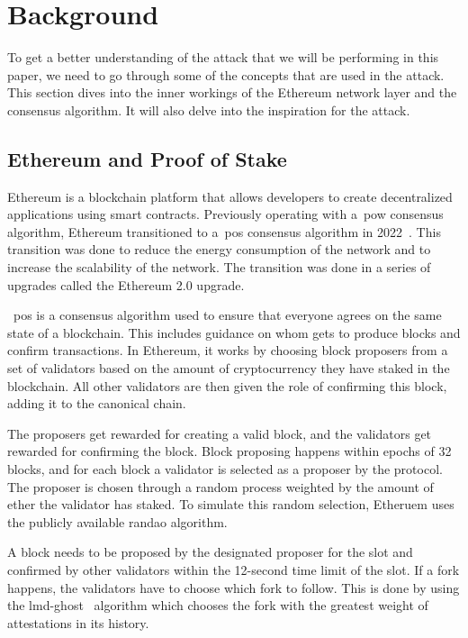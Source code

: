 
\section{Background}\label{sec:background}
To get a better understanding of the attack that we will be performing in this paper, we need to go through some of the concepts that are used in the attack.
This section dives into the inner workings of the Ethereum network layer and the consensus algorithm.
It will also delve into the inspiration for the attack.


\subsection{Ethereum and Proof of Stake}\label{subsec:ethereum-and-proof-of-stake}
Ethereum is a blockchain platform that allows developers to create decentralized applications using smart contracts.
Previously operating with a~\gls{pow} consensus algorithm, Ethereum transitioned to a~\gls{pos} consensus algorithm in 2022~\cite{EthereumProof-of-stakePoS}.
This transition was done to reduce the energy consumption of the network and to increase the scalability of the network.
The transition was done in a series of upgrades called the Ethereum 2.0 upgrade.

~\gls{pos} is a consensus algorithm used to ensure that everyone agrees on the same state of a blockchain.
This includes guidance on whom gets to produce blocks and confirm transactions.
In Ethereum, it works by choosing block proposers from a set of validators based on the amount of cryptocurrency they have staked in the blockchain.
All other validators are then given the role of confirming this block, adding it to the canonical chain.

The proposers get rewarded for creating a valid block, and the validators get rewarded for confirming the block.
Block proposing happens within epochs of 32 blocks, and for each block a validator is selected as a proposer by the protocol.
The proposer is chosen through a random process weighted by the amount of ether the validator has staked.
To simulate this random selection, Etheruem uses the publicly available \gls{randao} algorithm.

A block needs to be proposed by the designated proposer for the slot and confirmed by other validators within the 12-second time limit of the slot.
If a fork happens, the validators have to choose which fork to follow.
This is done by using the \gls{lmd-ghost}~\cite{EthereumProof-of-stakePoS} algorithm which chooses the fork with the greatest weight of attestations in its history.


